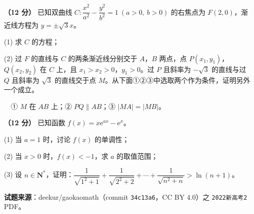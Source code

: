 \begin{question}
\textbf{（12 分）} 已知双曲线 $C:\dfrac{x^{2}}{a^{2}}-\dfrac{y^{2}}{b^{2}}=1\ (a>0,\ b>0)$ 的右焦点为 $F(2,0)$，渐近线方程为 $y=\pm\sqrt3x$。

  (1) 求 $C$ 的方程；

  (2) 过 $F$ 的直线与 $C$ 的两条渐近线分别交于 $A$，$B$ 两点，点 $P\left(x_1,y_1\right)$，$Q\left(x_2,y_2\right)$ 在 $C$ 上，且 $x_1>x_2>0$，$y_1>0$。过 $P$ 且斜率为 $-\sqrt3$ 的直线与过 $Q$ 且斜率为 $\sqrt3$ 的直线交于点 $M$。从下面①②③中选取两个作为条件，证明另外一个成立。

  　① $M$ 在 $AB$ 上；② $PQ\parallel AB$；③ $|MA|=|MB|$。

\end{question}
\begin{question}
\textbf{（12 分）} 已知函数 $f(x)=x\mathrm e^{ax}-\mathrm e^{x}$。

  (1) 当 $a=1$ 时，讨论 $f(x)$ 的单调性；

  (2) 当 $x>0$ 时，$f(x)<-1$，求 $a$ 的取值范围；

  (3) 设 $n\in\mathbf N^{*}$，证明：$\dfrac1{\sqrt{1^{2}+1}}+\dfrac1{\sqrt{2^{2}+2}}+\cdots+\dfrac1{\sqrt{n^{2}+n}}>\ln(n+1)$。

\par\medskip

\begin{gktip}
\textbf{试题来源}：deekur/gaokaomath（commit \texttt{34c13a6}，CC BY 4.0）之 \texttt{2022新高考2} PDF。
\end{gktip}

\end{question}